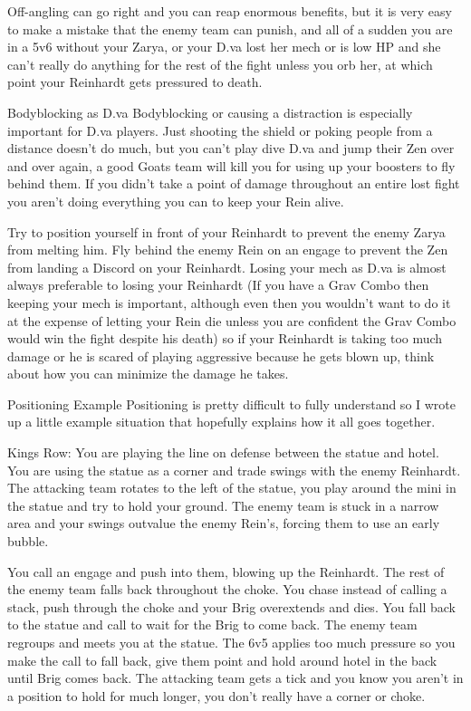 Off-angling can go right and you can reap enormous benefits, but it is very easy to make a mistake that the enemy team can punish, and all of a sudden you are in a 5v6 without your Zarya, or your D.va lost her mech or is low HP and she can’t really do anything for the rest of the fight unless you orb her, at which point your Reinhardt gets pressured to death.

Bodyblocking as D.va
Bodyblocking or causing a distraction is especially important for D.va players. Just shooting the shield or poking people from a distance doesn’t do much, but you can’t play dive D.va and jump their Zen over and over again, a good Goats team will kill you for using up your boosters to fly behind them. If you didn’t take a point of damage throughout an entire lost fight you aren’t doing everything you can to keep your Rein alive.

Try to position yourself in front of your Reinhardt to prevent the enemy Zarya from melting him. Fly behind the enemy Rein on an engage to prevent the Zen from landing a Discord on your Reinhardt. Losing your mech as D.va is almost always preferable to losing your Reinhardt (If you have a Grav Combo then keeping your mech is important, although even then you wouldn't want to do it at the expense of letting your Rein die unless you are confident the Grav Combo would win the fight despite his death) so if your Reinhardt is taking too much damage or he is scared of playing aggressive because he gets blown up, think about how you can minimize the damage he takes.






Positioning Example
Positioning is pretty difficult to fully understand so I wrote up a little example situation that hopefully explains how it all goes together.

Kings Row: You are playing the line on defense between the statue and hotel. You are using the statue as a corner and trade swings with the enemy Reinhardt. The attacking team rotates to the left of the statue, you play around the mini in the statue and try to hold your ground. The enemy team is stuck in a narrow area and your swings outvalue the enemy Rein’s, forcing them to use an early bubble. 

You call an engage and push into them, blowing up the Reinhardt. The rest of the enemy team falls back throughout the choke. You chase instead of calling a stack, push through the choke and your Brig overextends and dies. You fall back to the statue and call to wait for the Brig to come back. The enemy team regroups and meets you at the statue. The 6v5 applies too much pressure so you make the call to fall back, give them point and hold around hotel in the back until Brig comes back. The attacking team gets a tick and you know you aren’t in a position to hold for much longer, you don’t really have a corner or choke.


